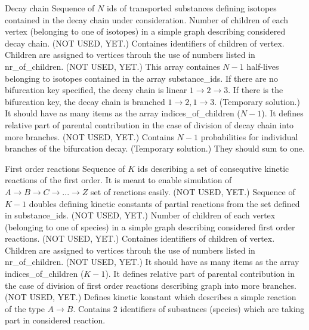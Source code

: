 \begin{recordtype}{Decay chain}{}
Sequence of $N$ ids of transported substances defining isotopes contained in the decay chain under consideration.
Number of children of each vertex (belonging to one of isotopes) in a simple graph describing considered decay chain. (NOT USED, YET.)
Containes identifiers of children of vertex. Children are assigned to vertices throuh the use of numbers listed in nr\_of\_children. (NOT USED, YET.)
This array containes $N-1$ half-lives belonging to isotopes contained in the array substance\_ids.
If there are no bifurcation key specified, the decay chain is linear $1\to 2 \to 3$.
If there is the bifurcation key, the decay chain is branched $1\to 2, 1\to 3$. (Temporary solution.)
It should have as many items as the array indices\_of\_children ($N-1$). It defines relative part of parental contribution in the case of division of decay chain into more branches. (NOT USED, YET.)\newline
Contains $N-1$ probabilities for individual branches of the bifurcation decay. (Temporary solution.)
They should sum to one.
\end{recordtype}

\begin{recordtype}{First order reactions}{}
Sequence of $K$ ids describing a set of consequtive kinetic reactions of the first order. It is meant to enable simulation of $A\rightarrow B\rightarrow C\rightarrow ...\rightarrow Z$ set of reactions easily. (NOT USED, YET.)
Sequence of $K-1$ doubles defining kinetic constants of partial reactions from the set defined in substance\_ids. (NOT USED, YET.)
Number of children of each vertex (belonging to one of species) in a simple graph describing considered first order reactions. (NOT USED, YET.)
Containes identifiers of children of vertex. Children are assigned to vertices throuh the use of numbers listed in nr\_of\_children. (NOT USED, YET.)
It should have as many items as the array indices\_of\_children ($K-1$). It defines relative part of parental contribution in the case of division of first order reactions describing graph into more branches. (NOT USED, YET.)
Defines kinetic konstant which describes a simple reaction of the type $A\rightarrow B$.
Contains $2$ identifiers of subsatnces (species) which are taking part in considered reaction.
\end{recordtype}

